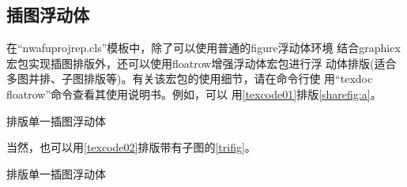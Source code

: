 \documentclass[
  ]{nwafuprojrep}
\begin{document}
\subsection{插图浮动体}
在\enquote{nwafuprojrep.cls}模板中，除了可以使用普通的figure浮动体环境
结合graphicx宏包实现插图排版外，还可以使用floatrow增强浮动体宏包进行浮
动体排版(适合多图并排、子图排版等)。有关该宏包的使用细节，请在命令行使
用\enquote{texdoc floatrow}命令查看其使用说明书。例如，可以
用\autoref{texcode01}排版\autoref{sharefig:a}。

\begin{center}
\begin{langCVOne}[tex][texcode01][\LaTeX{}]{排版单一插图浮动体}
  \begin{figure}[!htp]
    \begin{floatrow}
    \end{floatrow}
  \end{figure}
\end{langCVOne}
\end{center}

\begin{figure}[!htp]
  \begin{floatrow}
  \end{floatrow}
\end{figure}

当然，也可以用\autoref{texcode02}排版带有子图的\autoref{trifig}。  

\begin{center}
\begin{langCVOne}[tex][texcode02][\LaTeX{}]{排版单一插图浮动体}
\begin{figure}[!htp]
\end{figure}
\end{langCVOne}
\end{center}
\end{document}

